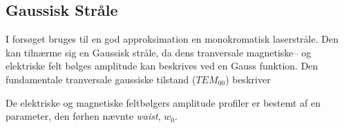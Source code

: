 \documentclass[main]{subfiles}
\begin{document}
\subsection{Gaussisk Stråle}
I forsøget bruges til en god approksimation en monokromatisk laserstråle. Den kan tilnærme sig en Gaussisk stråle, da dens tranversale magnetiske-- og elektriske felt bølges amplitude kan beskrives ved en Gauss funktion. Den fundamentale tranversale gaussiske tilstand ($TEM_{00}$) beskriver

De elektriske og magnetiske feltbølgers amplitude profiler er bestemt af en parameter, den førhen nævnte \emph{waist}, $w_0$.
\end{document}
